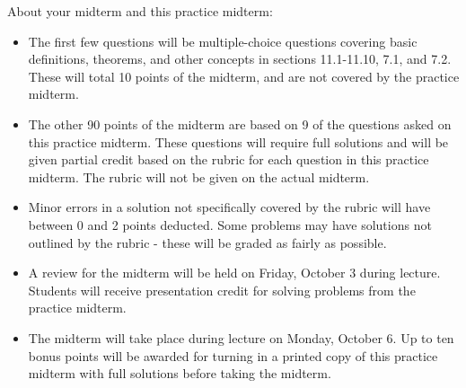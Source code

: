 \documentclass[12pt]{exam}
\begin{document}
\begin{center}
\end{center}
\vspace{0.1in}

\vspace{12pt}

\noindent About your midterm and this practice midterm:
\begin{itemize}
  \item
    The first few questions will be multiple-choice questions
    covering basic definitions, theorems, and other concepts in sections
    11.1-11.10, 7.1, and 7.2.
    These will total 10 points of the midterm, and are not covered
    by the practice midterm.
  \item
    The other 90 points of the midterm are based on 9 of the questions
    asked on this practice midterm. These questions will require full solutions
    and will be given partial credit based on the rubric for each question
    in this practice midterm. The rubric will not be given on the actual
    midterm.
  \item
    Minor errors in a solution not specifically covered by the rubric will have
    between 0 and 2 points deducted. Some problems may have solutions not
    outlined by the rubric - these will be graded as fairly as possible.
  \item
    A review for the midterm will be held on Friday, October 3 during lecture.
    Students will receive presentation credit for solving problems from the
    practice midterm.
  \item
    The midterm will take place during lecture on Monday, October 6. Up to
    ten bonus points will be awarded for turning in a printed copy of
    this practice midterm with full solutions before taking the midterm.
\end{itemize}

\newpage
\end{document}
